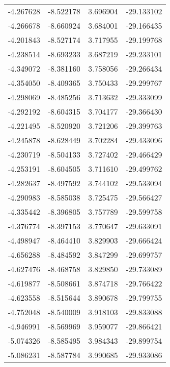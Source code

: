 \begin{tabular}{rrrr}
       -4.267628 &        -8.522178 &    3.696904 & -29.133102 \\
       -4.266678 &        -8.660924 &    3.684001 & -29.166435 \\
       -4.201843 &        -8.527174 &    3.717955 & -29.199768 \\
       -4.238514 &        -8.693233 &    3.687219 & -29.233101 \\
       -4.349072 &        -8.381160 &    3.758056 & -29.266434 \\
       -4.354050 &        -8.409365 &    3.750433 & -29.299767 \\
       -4.298069 &        -8.485256 &    3.713632 & -29.333099 \\
       -4.292192 &        -8.604315 &    3.704177 & -29.366430 \\
       -4.221495 &        -8.520920 &    3.721206 & -29.399763 \\
       -4.245878 &        -8.628449 &    3.702284 & -29.433096 \\
       -4.230719 &        -8.504133 &    3.727402 & -29.466429 \\
       -4.253191 &        -8.604505 &    3.711610 & -29.499762 \\
       -4.282637 &        -8.497592 &    3.744102 & -29.533094 \\
       -4.290983 &        -8.585038 &    3.725475 & -29.566427 \\
       -4.335442 &        -8.396805 &    3.757789 & -29.599758 \\
       -4.376774 &        -8.397153 &    3.770647 & -29.633091 \\
       -4.498947 &        -8.464410 &    3.829903 & -29.666424 \\
       -4.656288 &        -8.484592 &    3.847299 & -29.699757 \\
       -4.627476 &        -8.468758 &    3.829850 & -29.733089 \\
       -4.619877 &        -8.508661 &    3.874718 & -29.766422 \\
       -4.623558 &        -8.515644 &    3.890678 & -29.799755 \\
       -4.752048 &        -8.540009 &    3.918103 & -29.833088 \\
       -4.946991 &        -8.569969 &    3.959077 & -29.866421 \\
       -5.074326 &        -8.585495 &    3.984343 & -29.899754 \\
       -5.086231 &        -8.587784 &    3.990685 & -29.933086 \\

\end{tabular}
